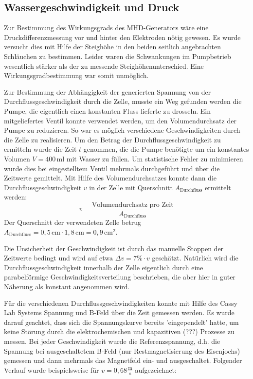 \documentclass[11pt]{scrartcl}
\newcommand{\unit}[1]{\ensuremath{\,\mathrm{#1}}} %
\begin{document}
\subsection{Wassergeschwindigkeit und Druck}		%
Zur Bestimmung des Wirkungsgrads des MHD-Generators wäre eine Druckdifferenzmessung vor und hinter den Elektroden nötig gewesen.
Es wurde versucht dies mit Hilfe der Steighöhe in den beiden seitlich angebrachten Schläuchen zu bestimmen. Leider waren die Schwankungen im Pumpbetrieb wesentlich stärker als der zu messende Steighöhenunterschied.
Eine Wirkungsgradbestimmung war somit unmöglich.

Zur Bestimmung der Abhängigkeit der generierten Spannung von der Durchflussgeschwindigkeit durch die Zelle, musste ein Weg gefunden werden die Pumpe, die eigentlich einen konstanten Fluss lieferte zu drosseln.
Ein mitgeliefertes Ventil konnte verwendet werden, um den Volumendurchsatz der Pumpe zu reduzieren. So war es möglich verschiedene Geschwindigkeiten durch die Zelle zu realisieren.
Um den Betrag der Durchflussgeschwindigkeit zu ermitteln wurde die Zeit $t$ genommen, die die Pumpe benötigte um ein konstantes Volumen $V=400\unit{ml}$ mit Wasser zu füllen. Um statistische Fehler zu minimieren wurde dies bei eingestelltem Ventil mehrmals durchgeführt und über die Zeitwerte gemittelt.
Mit Hilfe des Volumendurchsatzes konnte dann die Durchflussgeschwindigkeit $v$ in der Zelle mit Querschnitt $A_{\text{Durchfluss}}$ ermittelt werden:
\begin{equation}
v=\frac{\text{Volumendurchsatz pro Zeit}}{A_{\text{Durchfluss}}}
\end{equation}
Der Querschnitt der verwendeten Zelle betrug $A_{\text{Durchfluss}}=0,5\unit{cm} \cdot 1,8\unit{cm}=0,9\unit{cm^{2}}$.

Die Unsicherheit der Geschwindigkeit ist durch das manuelle Stoppen der Zeitwerte bedingt und wird auf etwa $\Delta v=7\% \cdot v$ geschätzt.
Natürlich wird die Durchflussgeschwindigkeit innerhalb der Zelle eigentlich durch eine parabelförmige Geschwindigkeitsverteilung beschrieben, die aber hier in guter Näherung als konstant angenommen wird. 

Für die verschiedenen Durchflussgeschwindigkeiten konnte mit Hilfe des Cassy Lab Systems Spannung und B-Feld über die Zeit gemessen werden. Es wurde darauf geachtet, dass sich die Spannungskurve bereits 'eingependelt' hatte, um keine Störung durch die elektrochemischen und kapazitiven (???) Prozesse zu messen.
Bei jeder Geschwindigkeit wurde die Referenzspannung, d.h. die Spannung bei ausgeschaltetem B-Feld (nur Restmagnetisierung des Eisenjochs) gemessen und dann mehrmals das Magnetfeld ein- und ausgeschaltet.
Folgender Verlauf wurde beispielsweise für $v=0,68\frac{\unit{m}}{\unit{s}}$ aufgezeichnet:
\end{document}
